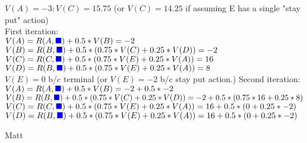 \begin{parts}
\begin{subparts}
    \begin{soln}
    $V(A) = -3; V(C) = 15.75$ (or $V(C) = 14.25$ if assuming E has a single "stay put" action) \\
    First iteration: \\
    $V(A) = R(A, \text{\color{blue}$\blacksquare$}) + 0.5 * V(B) = -2 $ \\
    $V(B) = R(B, \text{\color{blue}$\blacksquare$}) + 0.5 * (0.75 * V(C) + 0.25 * V(D)) = -2$ \\
    $V(C) = R(C, \text{\color{blue}$\blacksquare$}) + 0.5 * (0.75 * V(E) + 0.25 * V(A)) = 16$ \\
    $V(D) = R(B, \text{\color{blue}$\blacksquare$}) + 0.5 * (0.75 * V(E) + 0.25 * V(A)) = 8$ \\
    $V(E) = 0$ b/c terminal (or $V(E) = -2$ b/c stay put action.)
    Second iteration: \\
    $V(A) = R(A, \text{\color{blue}$\blacksquare$}) + 0.5 * V(B) = -2 + 0.5 * -2 $ \\
    $V(B) = R(B, \text{\color{blue}$\blacksquare$}) + 0.5 * (0.75 * V(C) + 0.25 * V(D)) = -2 + 0.5 * (0.75*16 + 0.25*8)$ \\
    $V(C) = R(C, \text{\color{blue}$\blacksquare$}) + 0.5 * (0.75 * V(E) + 0.25 * V(A)) = 16 + 0.5*(0 + 0.25*-2)$ \\
    $V(D) = R(B, \text{\color{blue}$\blacksquare$}) + 0.5 * (0.75 * V(E) + 0.25 * V(A)) = 16 + 0.5*(0 + 0.25*-2)$ \\
    \end{soln}
    \begin{qauthor}    Matt    \end{qauthor}
    
\end{subparts}

\end{parts}